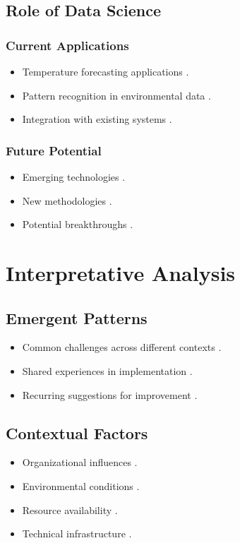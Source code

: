 \documentclass[a4paper]{report}
\begin{document}
\subsection{Role of Data Science}  
\subsubsection{Current Applications}  
\begin{itemize}  
    \item Temperature forecasting applications \cite{williams2024}.  
    \item Pattern recognition in environmental data \cite{li2023}.  
    \item Integration with existing systems \cite{carter2024}.  
\end{itemize}  

\subsubsection{Future Potential}  
\begin{itemize}  
    \item Emerging technologies \cite{martinez2024}.  
    \item New methodologies \cite{miller2023}.  
    \item Potential breakthroughs \cite{singh2023}.  
\end{itemize}  

\section{Interpretative Analysis}  
\subsection{Emergent Patterns}  
\begin{itemize}  
    \item Common challenges across different contexts \cite{johnson2023}.  
    \item Shared experiences in implementation \cite{harrison2024}.  
    \item Recurring suggestions for improvement \cite{green2023}.  
\end{itemize}  

\subsection{Contextual Factors}  
\begin{itemize}  
    \item Organizational influences \cite{rodriguez2023}.  
    \item Environmental conditions \cite{adams2024}.  
    \item Resource availability \cite{jones2023}.  
    \item Technical infrastructure \cite{clark2024}.  
\end{itemize}  
\end{document}
